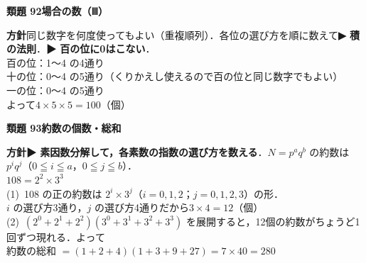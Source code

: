 \documentclass[a4paper,11pt]{ltjsarticle}
\newcommand{\ans}[2]{\Needspace{5\baselineskip}\vspace{6pt}%
  {\sffamily\bfseries 類題 #1\quad #2}\par}
\newcommand{\point}[1]{\textsf{\bfseries ▶ #1}}
\begin{document}
\ans{92}{場合の数（Ⅲ）}
\begin{kai}
\textbf{方針}\quad 同じ数字を何度使ってもよい（重複順列）．各位の選び方を順に数えて\point{積の法則}．\point{百の位に0はこない}．\\[2pt]
百の位：1〜4 の4通り\\
十の位：0〜4 の5通り（くりかえし使えるので百の位と同じ数字でもよい）\\
一の位：0〜4 の5通り\\[2pt]
よって\quad $4\times5\times5=100$（個）
\end{kai}

\ans{93}{約数の個数・総和}
\begin{kai}
\textbf{方針}\quad \point{素因数分解して，各素数の指数の選び方を数える}．$N=p^aq^b$ の約数は $p^iq^j$（$0\leqq i\leqq a$，$0\leqq j\leqq b$）．\\[2pt]
$108=2^2\times3^3$\\[2pt]
(1)\ 108 の正の約数は $2^i\times3^j$（$i=0,1,2$；$j=0,1,2,3$）の形．\\
\hspace*{1.5em}$i$ の選び方3通り，$j$ の選び方4通りだから\quad $3\times4=12$（個）\\[2pt]
(2)\ $(2^0+2^1+2^2)(3^0+3^1+3^2+3^3)$ を展開すると，12個の約数がちょうど1回ずつ現れる．よって\\
\hspace*{1.5em}約数の総和 $=(1+2+4)(1+3+9+27)=7\times40=280$
\end{kai}
\end{document}
